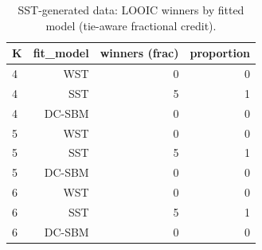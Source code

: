 \begin{table}[!h]
\centering
\caption{SST-generated data: LOOIC winners by fitted model (tie-aware fractional credit).\\\label{tab:sst-appx-loo-winners}}
\centering
\begin{tabular}[t]{lrrr}
\toprule
K & fit_model & winners (frac) & proportion\\
\midrule
4 & WST & 0 & 0\\
4 & SST & 5 & 1\\
4 & DC-SBM & 0 & 0\\
5 & WST & 0 & 0\\
5 & SST & 5 & 1\\
5 & DC-SBM & 0 & 0\\
6 & WST & 0 & 0\\
6 & SST & 5 & 1\\
6 & DC-SBM & 0 & 0\\
\bottomrule
\end{tabular}
\end{table}
